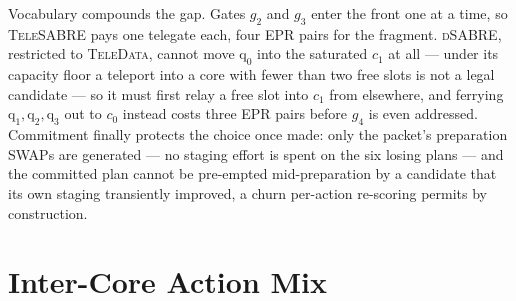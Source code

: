 \documentclass[journal]{IEEEtran}
\newcommand{\TeleSABRE}{\textsc{TeleSABRE}}
\newcommand{\dSABRE}{\textsc{dSABRE}}
\newcommand{\TeleData}{\textsc{TeleData}}
\newcommand{\logi}[1]{\mathrm{q}_{#1}}
\begin{document}
Vocabulary compounds the gap. Gates $g_2$ and $g_3$ enter the front one
at a time, so \TeleSABRE{} pays one telegate each, four EPR pairs for
the fragment. \dSABRE{}, restricted to \TeleData{}, cannot move
$\logi{0}$ into the saturated $c_1$ at all --- under its capacity
floor a teleport into a core with fewer than two free slots is not a
legal candidate --- so it must first relay a free slot into $c_1$ from
elsewhere, and ferrying $\logi{1},\logi{2},\logi{3}$ out to $c_0$
instead costs three EPR pairs before $g_4$ is even addressed.
Commitment finally protects the choice once made: only the packet's
preparation SWAPs are generated --- no staging effort is spent on the
six losing plans --- and the committed plan cannot be pre-empted
mid-preparation by a candidate that its own staging transiently
improved, a churn per-action re-scoring permits by construction.


\section{Inter-Core Action Mix}
\label{sec:actionmix}
\end{document}
